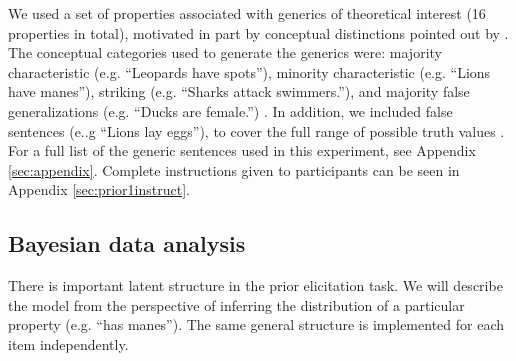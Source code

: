 \documentclass[10pt,letterpaper]{article}
\begin{document}
We used a set of properties associated with generics of theoretical interest (16 properties in total), motivated in part by conceptual distinctions pointed out by . 
The conceptual categories used to generate the generics were: majority characteristic (e.g. ``Leopards have spots''), minority characteristic (e.g. ``Lions have manes''), striking (e.g. ``Sharks attack swimmers.''), and majority false generalizations (e.g. ``Ducks are female.'') \cite{Prasada2013}. In addition, we included false sentences (e..g ``Lions lay eggs''), to cover the full range of possible truth values .
For a full list of the generic sentences used in this experiment, see Appendix \ref{sec:appendix}.
Complete instructions given to participants can be seen in Appendix \ref{sec:prior1instruct}.



\subsection{Bayesian data analysis}
\label{sec:bda1}

There is important latent structure in the prior elicitation task. We will describe the model from the perspective of inferring the distribution of a particular property (e.g. ``has manes''). 
The same general structure is implemented for each item independently. 
\end{document}
